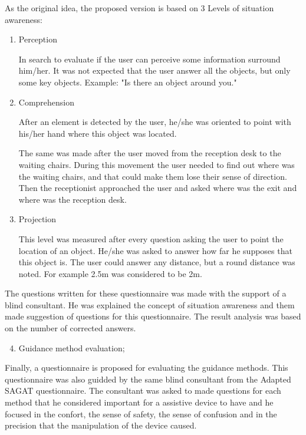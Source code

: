         As the original idea, the proposed version is based on 3 Levels of situation awareness: 

        \begin{enumerate}[leftmargin = 6em, label = Level \arabic* -- ]
            \item Perception
            
            In search to evaluate if the user can perceive some information surround him/her. It was not expected that the user answer all the objects, but only some key objects.
            Example: "Is there an object around you."

            \item Comprehension
    
            After an element is detected by the user, he/she was oriented to point with his/her hand where this object was located. 
            
            The same was made after the user moved from the reception desk to the waiting chairs. During this movement the user needed to find out where was the waiting chairs, and that could make them lose their sense of direction. Then the receptionist approached the user and asked where was the exit and where was the reception desk.        
    
            \item Projection
            
            This level was measured after every question asking the user to point the location of an object. He/she was asked to answer how far he supposes that this object is. The user could answer any distance, but a round distance was noted. For example 2.5m was considered to be 2m.            
            
        \end{enumerate}      

        The questions written for these questionnaire was made with the support of a blind consultant. He was explained the concept of situation awareness and them made suggestion of questions for this questionnaire. The result analysis was based on the number of corrected answers.

        \begin{enumerate} [label = \Alph*)]
            \setcounter{enumi}{3}
            \item Guidance method evaluation;
        \end{enumerate}

        Finally, a questionnaire is proposed for evaluating the guidance methods. This questionnaire was also guidded by the same blind consultant from the Adapted SAGAT questionnaire. The consultant was asked to made questions for each method that he considered important for a assistive device to have and he focused in the confort, the sense of safety, the sense of confusion and in the precision that the manipulation of the device caused.
        
